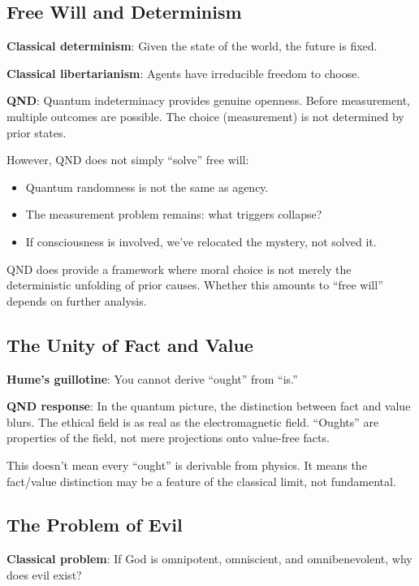 \documentclass[12pt]{article}
\begin{document}
\subsection{Free Will and Determinism}

\textbf{Classical determinism}: Given the state of the world, the future is fixed.

\textbf{Classical libertarianism}: Agents have irreducible freedom to choose.

\textbf{QND}: Quantum indeterminacy provides genuine openness. Before measurement, multiple outcomes are possible. The choice (measurement) is not determined by prior states.

However, QND does not simply ``solve'' free will:
\begin{itemize}
    \item Quantum randomness is not the same as agency.
    \item The measurement problem remains: what triggers collapse?
    \item If consciousness is involved, we've relocated the mystery, not solved it.
\end{itemize}

QND does provide a framework where moral choice is not merely the deterministic unfolding of prior causes. Whether this amounts to ``free will'' depends on further analysis.

\subsection{The Unity of Fact and Value}

\textbf{Hume's guillotine}: You cannot derive ``ought'' from ``is.''

\textbf{QND response}: In the quantum picture, the distinction between fact and value blurs. The ethical field is as real as the electromagnetic field. ``Oughts'' are properties of the field, not mere projections onto value-free facts.

This doesn't mean every ``ought'' is derivable from physics. It means the fact/value distinction may be a feature of the classical limit, not fundamental.

\subsection{The Problem of Evil}

\textbf{Classical problem}: If God is omnipotent, omniscient, and omnibenevolent, why does evil exist?
\end{document}
